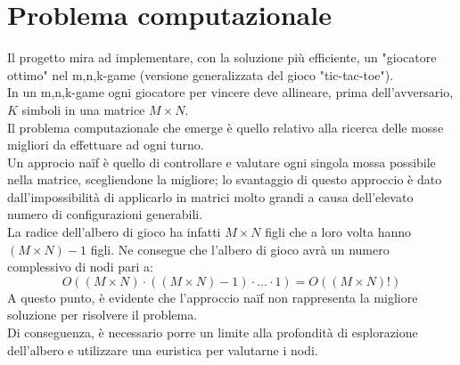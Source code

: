 \section{Problema computazionale}
Il progetto mira ad implementare, con la soluzione più efficiente, un "giocatore ottimo" nel m,n,k-game (versione generalizzata del gioco "tic-tac-toe").\\
In un m,n,k-game ogni giocatore per vincere deve allineare, prima dell'avversario, $ K $ simboli in una matrice $ M \times N $.\\
Il problema computazionale che emerge è quello relativo alla ricerca delle mosse migliori da effettuare ad ogni turno.\\
Un approcio naïf è quello di controllare e valutare ogni singola mossa possibile nella matrice, scegliendone la migliore; lo svantaggio di questo approccio è dato dall'impossibilità di applicarlo in matrici molto grandi a causa dell'elevato numero di configurazioni generabili.\\
La radice dell'albero di gioco ha infatti $ M \times N $ figli che a loro volta hanno $ (M \times N) - 1 $ figli.
Ne consegue che l'albero di gioco avrà un numero complessivo di nodi pari a:
\[
O((M \times N) \cdot ((M \times N) - 1)\cdot \ldots \cdot 1) = O((M \times N)!)
\]
A questo punto, è evidente che l'approccio naïf non rappresenta la migliore soluzione per risolvere il problema.\\
Di conseguenza, è necessario porre un limite alla profondità di esplorazione dell'albero e utilizzare una euristica per valutarne i nodi.
